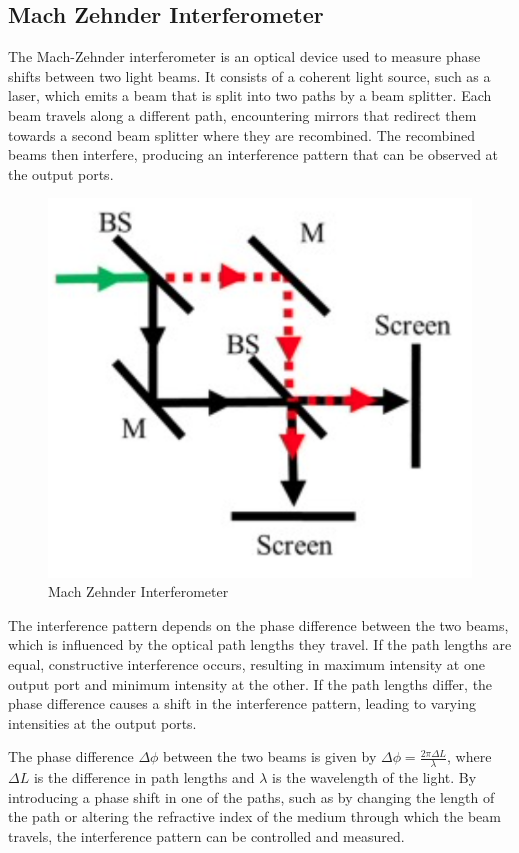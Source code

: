 \documentclass[
  a4paper,
]{book}
\begin{document}
\subsection{Mach Zehnder
Interferometer}\label{mach-zehnder-interferometer}

The Mach-Zehnder interferometer is an optical device used to measure
phase shifts between two light beams. It consists of a coherent light
source, such as a laser, which emits a beam that is split into two paths
by a beam splitter. Each beam travels along a different path,
encountering mirrors that redirect them towards a second beam splitter
where they are recombined. The recombined beams then interfere,
producing an interference pattern that can be observed at the output
ports.

\begin{figure}[H]

{\centering \includegraphics[width=0.3\linewidth,height=\textheight,keepaspectratio]{wave-optics/img/mach.png}

}

\caption{Mach Zehnder Interferometer}

\end{figure}%

The interference pattern depends on the phase difference between the two
beams, which is influenced by the optical path lengths they travel. If
the path lengths are equal, constructive interference occurs, resulting
in maximum intensity at one output port and minimum intensity at the
other. If the path lengths differ, the phase difference causes a shift
in the interference pattern, leading to varying intensities at the
output ports.

The phase difference \(\Delta \phi\) between the two beams is given by
\(\Delta \phi = \frac{2\pi \Delta L}{\lambda}\), where \(\Delta L\) is
the difference in path lengths and \(\lambda\) is the wavelength of the
light. By introducing a phase shift in one of the paths, such as by
changing the length of the path or altering the refractive index of the
medium through which the beam travels, the interference pattern can be
controlled and measured.
\end{document}
